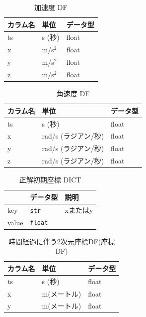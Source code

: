 \begin{table}[ht]
	\caption{加速度 DF}
	\centering
	\begin{tabular}{lll}
		\toprule
		カラム名 & 単位        & データ型  \\
		\midrule
		ts   & s (秒)     & float \\
		x    & m/s\(^2\) & float \\
		y    & m/s\(^2\) & float \\
		z    & m/s\(^2\) & float \\
		\bottomrule
	\end{tabular}
\end{table}

\begin{table}[ht]
	\caption{角速度 DF}
	\centering
	\begin{tabular}{lll}
		\toprule
		カラム名 & 単位             & データ型  \\
		\midrule
		ts   & s (秒)          & float \\
		x    & rad/s (ラジアン/秒) & float \\
		y    & rad/s (ラジアン/秒) & float \\
		z    & rad/s (ラジアン/秒) & float \\
		\bottomrule
	\end{tabular}
\end{table}


\begin{table}[ht]
	\caption{正解初期座標 DICT}
	\centering
	\label{tab:first-coord-dict}
	\begin{tabular}{lll}
		\hline
		      & {データ型}         & {説明}          \\ \hline
		key   & \texttt{str}   & xまたはy         \\ \hline
		value & \texttt{float} & \makecell{座標} \\ \hline
	\end{tabular}
\end{table}


\begin{table}[ht]
  \caption{時間経過に伴う2次元座標DF(座標DF)}
	\centering
	\begin{tabular}{lll}
		\toprule
		カラム名 & 単位      & データ型  \\
		\midrule
		ts   & s (秒)   & float \\
		x    & m(メートル) & float \\
		y    & m(メートル) & float \\
		\bottomrule
	\end{tabular}
\end{table}


